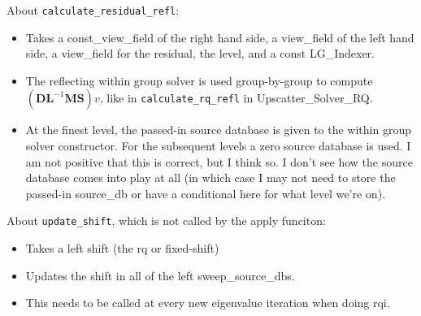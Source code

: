 \documentclass[12pt, letterpaper]{article}
\newcommand{\ve}[1]{\ensuremath{\mathbf{#1}}}
\begin{document}
About \verb+calculate_residual_refl+:
\begin{itemize}
  \item Takes a const\_view\_field of the right hand side, a view\_field of the left hand side, a view\_field for the residual, the level, and a const LG\_Indexer.
  \item The reflecting within group solver is used group-by-group to compute $(\ve{DL}^{-1}\ve{MS})v$, like in \verb+calculate_rq_refl+ in Upscatter\_Solver\_RQ.
  \item At the finest level, the passed-in source database is given to the within group solver constructor. For the subsequent levels a zero source database is used. I am not positive that this is correct, but I think so. I don't see how the source database comes into play at all (in which case I may not need to store the passed-in source\_db or have a conditional here for what level we're on). 
\end{itemize}
\noindent About \verb+update_shift+, which is not called by the apply funciton:
\begin{itemize}
  \item Takes a left shift (the rq or fixed-shift) 
  \item Updates the shift in all of the left sweep\_source\_dbs.
  \item This needs to be called at every new eigenvalue iteration when doing rqi.
\end{itemize}
\end{document}
